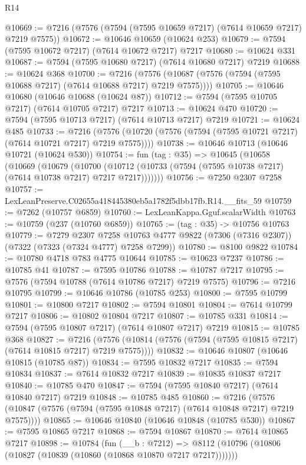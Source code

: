 \begin{lexlean}{R14}
\begin{coremodule}
@10669 := @7216 (@7576 (@7594 (@7595 @10659 @7217) (@7614 @10659 @7217) @7219 @7575))
@10672 := @10646 @10659 (@10624 @253)
@10679 := @7594 (@7595 @10672 @7217) (@7614 @10672 @7217) @7217
@10680 := @10624 @331
@10687 := @7594 (@7595 @10680 @7217) (@7614 @10680 @7217) @7219
@10688 := @10624 @368
@10700 := @7216
    (@7576 (@10687 (@7576 (@7594 (@7595 @10688 @7217) (@7614 @10688 @7217) @7219 @7575))))
@10705 := @10646 @10680 (@10646 @10688 (@10624 @87))
@10712 := @7594 (@7595 @10705 @7217) (@7614 @10705 @7217) @7217
@10713 := @10624 @470
@10720 := @7594 (@7595 @10713 @7217) (@7614 @10713 @7217) @7219
@10721 := @10624 @485
@10733 := @7216
    (@7576 (@10720 (@7576 (@7594 (@7595 @10721 @7217) (@7614 @10721 @7217) @7219 @7575))))
@10738 := @10646 @10713 (@10646 @10721 (@10624 @530))
@10754 := fun (tag : @35) =>
  @10645
    (@10658
      (@10669
        (@10679
          (@10700
            (@10712 (@10733 (@7594 (@7595 @10738 @7217) (@7614 @10738 @7217) @7217 @7217)))))))
@10756 := @7250 @2307 @7258
@10757 := LexLeanPreserve.C02655a418445380eb5a1782f5dbb17fb.R14.__fits_59
@10759 := @7262 (@10757 @6859)
@10760 := LexLeanKappa.Gguf.scalarWidth
@10763 := @10759 (@237 (@10760 @6859))
@10765 := (tag : @35) -> @10756 @10763
@10779 := @7279
    @2307
    @7258
    @10763
    @4777
    @9822
    (@7306 (@7316 @2307))
    (@7322 (@7323 (@7324 @4777) @7258 @7299))
@10780 := @8100 @9822
@10784 := @10780 @4718 @783 @4775 @10644
@10785 := @10623 @7237
@10786 := @10785 @41
@10787 := @7595 @10786
@10788 := @10787 @7217
@10795 := @7576 (@7594 @10788 (@7614 @10786 @7217) @7219 @7575)
@10796 := @7216 @10795
@10799 := @10646 @10786 (@10785 @253)
@10800 := @7595 @10799
@10801 := @10800 @7217
@10802 := @7594 @10801
@10804 := @7614 @10799 @7217
@10806 := @10802 @10804 @7217
@10807 := @10785 @331
@10814 := @7594 (@7595 @10807 @7217) (@7614 @10807 @7217) @7219
@10815 := @10785 @368
@10827 := @7216
    (@7576 (@10814 (@7576 (@7594 (@7595 @10815 @7217) (@7614 @10815 @7217) @7219 @7575))))
@10832 := @10646 @10807 (@10646 @10815 (@10785 @87))
@10834 := @7595 @10832 @7217
@10835 := @7594 @10834
@10837 := @7614 @10832 @7217
@10839 := @10835 @10837 @7217
@10840 := @10785 @470
@10847 := @7594 (@7595 @10840 @7217) (@7614 @10840 @7217) @7219
@10848 := @10785 @485
@10860 := @7216
    (@7576 (@10847 (@7576 (@7594 (@7595 @10848 @7217) (@7614 @10848 @7217) @7219 @7575))))
@10865 := @10646 @10840 (@10646 @10848 (@10785 @530))
@10867 := @7595 @10865 @7217
@10868 := @7594 @10867
@10870 := @7614 @10865 @7217
@10898 := @10784
    (fun (__b : @7212) =>
    @8112 (@10796 (@10806 (@10827 (@10839 (@10860 (@10868 @10870 @7217 @7217)))))))

\end{coremodule}
\end{lexlean}
